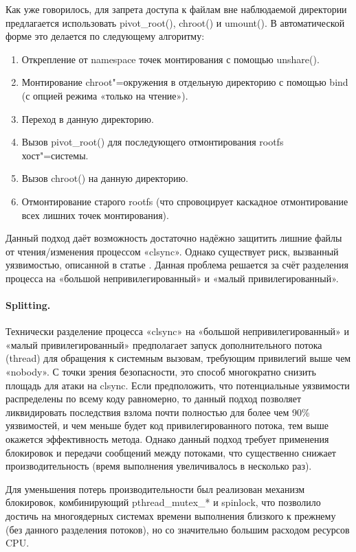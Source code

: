\documentclass[10pt, a5paper]{article}
\begin{document}
Как уже говорилось, для запрета доступа к файлам вне наблюдаемой директории предлагается использовать pivot\_root(), chroot() и umount(). В автоматической форме это делается по следующему алгоритму:

\begin{enumerate}
  \item Открепление от namespace точек монтирования с помощью unshare().
  \item Монтирование chroot"=окружения в отдельную директорию с помощью bind (с опцией режима «только на чтение»).
  \item Переход в данную директорию.
  \item Вызов pivot\_root() для последующего отмонтирования rootfs хост"=системы.
  \item Вызов chroot() на данную директорию.
  \item Отмонтирование старого rootfs (что спровоцирует каскадное отмонтирование всех лишних точек монтирования).
\end{enumerate}

Данный подход даёт возможность достаточно надёжно защитить лишние файлы от чтения/изменения процессом «clsync». Однако существует риск, вызванный уязвимостью, описанной в статье \cite{Okunev10}. Данная проблема решается за счёт разделения процесса на «большой непривилегированный» и «малый привилегированный».

\paragraph{Splitting.}

Технически разделение процесса «clsync» на «большой непривилегированный» и «малый привилегированный» предполагает запуск дополнительного потока (thread) для обращения к системным вызовам, требующим привилегий выше чем «nobody». С точки зрения безопасности, это способ многократно снизить площадь для атаки на clsync. Если предположить, что потенциальные уязвимости распределены по всему коду равномерно, то данный подход позволяет ликвидировать последствия взлома почти полностью для более чем 90\% уязвимостей, и чем меньше будет код привилегированного потока, тем выше окажется эффективность метода. Однако данный подход требует применения блокировок и передачи сообщений между потоками, что существенно снижает производительность (время выполнения увеличивалось в несколько раз).

Для уменьшения потерь производительности был реализован механизм блокировок, комбинирующий pthread\_mutex\_* и \linebreak spinlock, что позволило достичь на многоядерных системах времени выполнения близкого к прежнему (без данного разделения потоков), но со значительно большим расходом ресурсов CPU.
\end{document}
